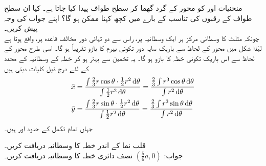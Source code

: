 منحنیات  اور   کو محور  کے گرد گھما کر سطح طواف پیدا کیا جاتا ہے۔ کیا ان سطح طواف کے رقبوں کی تناسب کے بارے میں کچھ کہنا ممکن ہو گا؟ اپنے جواب کی وجہ پیش کریں۔
\\
چونکہ مثلث کا وسطانی مرکز ہر ایک وسطانیہ پر، راس سے دو تہائی دور مخالف قاعدہ پر،  واقع ہوتا ہے لہٰذا شکل  میں محور  کے لحاظ سے باریک سایہ دور  تکونی بیرم کا بازو تقریباً  ہو گا۔ اسی طرح محور  کے لحاظ سے  اس باریک تکونی خطہ کا بازو  ہو گا۔ یہ تخمین  سے بہتر ہو کر خطہ  کے وسطانیہ کے محدد کے لئے درج ذیل کلیات دیتی ہیں
\begin{align*}
\bar{x}&=\frac{\int\frac{2}{3}r\cos\theta\cdot\frac{1}{2}r^2\dif\theta}{\int\frac{1}{2}r^2\dif\theta}=\frac{\frac{2}{3}\int r^3\cos\theta\dif\theta}{\int r^2\dif\theta}\\
\bar{y}&=\frac{\int\frac{2}{3}r\sin\theta\cdot\frac{1}{2}r^2\dif\theta}{\int\frac{1}{2}r^2\dif\theta}=\frac{\frac{2}{3}\int r^3\sin\theta\dif\theta}{\int r^2\dif\theta}
\end{align*}
جہاں تمام تکمل کے حدود  اور  ہیں۔

قلب نما  کے اندر خطہ کا وسطانیہ دریافت کریں۔\\
جواب:\quad
$(\tfrac{5}{6}a,0)$
نصف دائری خطہ  کا وسطانیہ دریافت کریں۔ 


